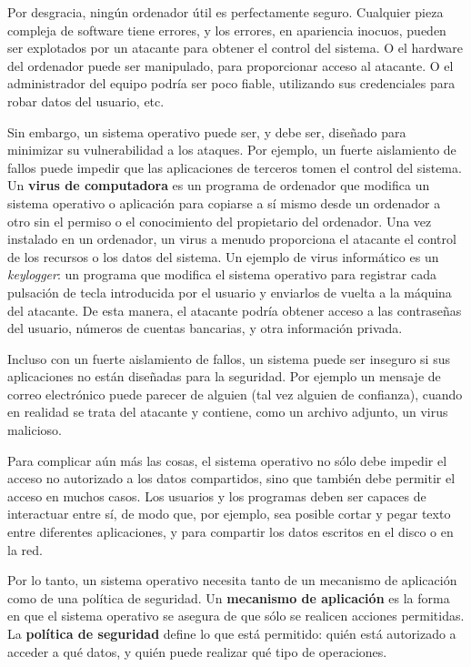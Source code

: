 \documentclass[10pt]{book}
\begin{document}
Por desgracia, ningún ordenador útil es perfectamente seguro. Cualquier pieza compleja de software tiene errores, y los errores, en apariencia inocuos, pueden ser explotados por un atacante para obtener el control del sistema. O el hardware del ordenador puede ser manipulado, para proporcionar acceso al atacante. O el administrador del equipo podría ser poco fiable, utilizando sus credenciales para robar datos del usuario, etc.

Sin embargo, un sistema operativo puede ser, y debe ser, diseñado para minimizar su vulnerabilidad a los ataques. Por ejemplo, un fuerte aislamiento de fallos puede impedir que las aplicaciones de terceros tomen el control del sistema. Un \textbf{virus de computadora} es un programa de ordenador que modifica un sistema operativo o aplicación para copiarse a sí mismo desde un ordenador a otro sin el permiso o el conocimiento del propietario del ordenador. Una vez instalado en un ordenador, un virus a menudo proporciona el atacante el control de los recursos o los datos del sistema. Un ejemplo de virus informático es un \textit{keylogger}: un programa que modifica el sistema operativo para registrar cada pulsación de tecla introducida por el usuario y enviarlos de vuelta a la máquina del atacante. De esta manera, el atacante podría obtener acceso a las contraseñas del usuario, números de cuentas bancarias, y otra información privada.

Incluso con un fuerte aislamiento de fallos, un sistema puede ser inseguro si sus aplicaciones no están diseñadas para la seguridad. Por ejemplo un mensaje de correo electrónico puede parecer de alguien (tal vez alguien de confianza), cuando en realidad se trata del atacante y contiene, como un archivo adjunto, un virus malicioso.

Para complicar aún más las cosas, el sistema operativo no sólo debe impedir el acceso no autorizado a los datos compartidos, sino que también debe permitir el acceso en muchos casos. Los usuarios y los programas deben ser capaces de interactuar entre sí, de modo que, por ejemplo, sea posible cortar y pegar texto entre diferentes aplicaciones, y para compartir los datos escritos en el disco o en la red.

Por lo tanto, un sistema operativo necesita tanto de un mecanismo de aplicación como de una política de seguridad. Un \textbf{mecanismo de aplicación} es la forma en que el sistema operativo se asegura de que sólo se realicen acciones permitidas. La \textbf{política de seguridad} define lo que está permitido: quién está autorizado a acceder a qué datos, y quién puede realizar qué tipo de operaciones.
\end{document}
